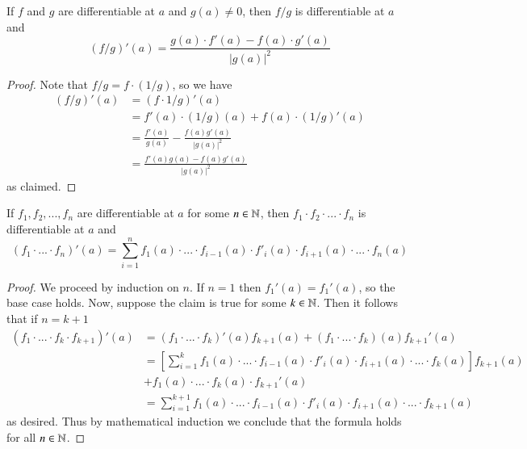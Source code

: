 \documentclass[12pt, a4paper, oneside, openright, titlepage]{book}
\begin{document}
\begin{thm}
    If $f$ and $g$ are differentiable at $a$ and $g(a) \neq 0$, then $f/g$ is differentiable at $a$ and $$(f/g)'(a) = \frac{g(a)\cdot f'(a) - f(a) \cdot g'(a)}{|g(a)|^2}$$
\end{thm}
\begin{proof}
    Note that $f/g = f\cdot (1/g)$, so we have \begin{align*}
        (f/g)'(a) &= (f\cdot 1/g)'(a) \\
        &= f'(a)\cdot(1/g)(a) + f(a)\cdot(1/g)'(a) \tag{Product Rule}\\
        &= \frac{f'(a)}{g(a)} -\frac{f(a)g'(a)}{|g(a)|^2} \tag{Quotient Derivative}\\
        &= \frac{f'(a)g(a) - f(a)g'(a)}{|g(a)|^2}
    \end{align*}
    as claimed.
\end{proof}

\begin{thm}
    If $f_1,f_2,...,f_n$ are differentiable at $a$ for some $n \in \mathbb N$, then $f_1\cdot f_2\cdot ...\cdot f_n$ is differentiable at $a$ and $$(f_1\cdot...\cdot f_n)'(a) = \sum\limits_{i=1}^nf_1(a)\cdot...\cdot f_{i-1}(a)\cdot f'_i(a)\cdot f_{i+1}(a)\cdot...\cdot f_n(a)$$
\end{thm}
\begin{proof}
    We proceed by induction on $n$. If $n = 1$ then $f_1'(a) = f_1'(a)$, so the base case holds. Now, suppose the claim is true for some $k \in \mathbb N$. Then it follows that if $n = k+1$ \begin{align*}
        (f_1\cdot ... \cdot f_k\cdot f_{k+1})'(a) &= (f_1\cdot ...\cdot f_k)'(a)f_{k+1}(a) + (f_1\cdot...\cdot f_k)(a)f_{k+1}'(a) \tag{Product Rule} \\
        &= \left[\sum\limits_{i=1}^kf_1(a)\cdot...\cdot f_{i-1}(a)\cdot f'_i(a)\cdot f_{i+1}(a)\cdot...\cdot f_k(a)\right]f_{k+1}(a)\\
        &+ f_1(a)\cdot ... \cdot f_k(a)\cdot f_{k+1}'(a) \tag{by Induction Hypothesis} \\
        &= \sum\limits_{i=1}^{k+1}f_1(a)\cdot...\cdot f_{i-1}(a)\cdot f'_i(a)\cdot f_{i+1}(a)\cdot...\cdot f_{k+1}(a)
    \end{align*}
    as desired. Thus by mathematical induction we conclude that the formula holds for all $n \in \mathbb N$.
\end{proof}
\end{document}
